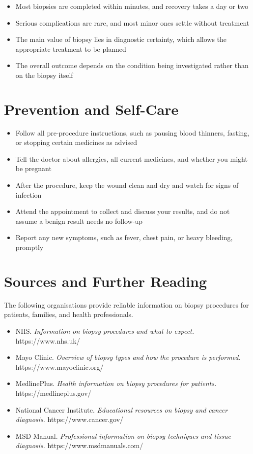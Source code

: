 \begin{itemize}
    \item Most biopsies are completed within minutes, and recovery takes a day or two
    \item Serious complications are rare, and most minor ones settle without treatment
    \item The main value of biopsy lies in diagnostic certainty, which allows the appropriate treatment to be planned
    \item The overall outcome depends on the condition being investigated rather than on the biopsy itself
\end{itemize}

\section*{Prevention and Self-Care}
\begin{itemize}
    \item Follow all pre-procedure instructions, such as pausing blood thinners, fasting, or stopping certain medicines as advised
    \item Tell the doctor about allergies, all current medicines, and whether you might be pregnant
    \item After the procedure, keep the wound clean and dry and watch for signs of infection
    \item Attend the appointment to collect and discuss your results, and do not assume a benign result needs no follow-up
    \item Report any new symptoms, such as fever, chest pain, or heavy bleeding, promptly
\end{itemize}

\section*{Sources and Further Reading}
The following organisations provide reliable information on biopsy procedures for patients, families, and health professionals.

\begin{itemize}
    \item NHS. \textit{Information on biopsy procedures and what to expect.} https://www.nhs.uk/
    \item Mayo Clinic. \textit{Overview of biopsy types and how the procedure is performed.} https://www.mayoclinic.org/
    \item MedlinePlus. \textit{Health information on biopsy procedures for patients.} https://medlineplus.gov/
    \item National Cancer Institute. \textit{Educational resources on biopsy and cancer diagnosis.} https://www.cancer.gov/
    \item MSD Manual. \textit{Professional information on biopsy techniques and tissue diagnosis.} https://www.msdmanuals.com/
\end{itemize}
